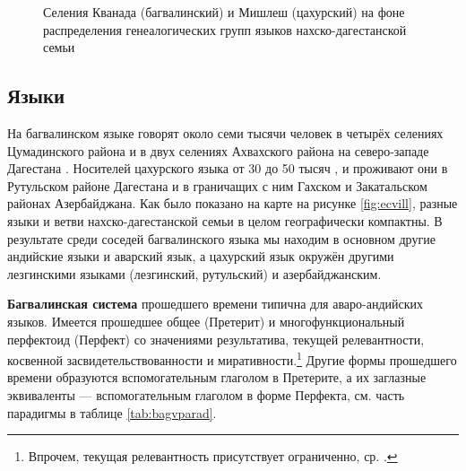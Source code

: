 \begin{figure}[h]
\centering
\caption{Селения Кванада (багвалинский) и Мишлеш (цахурский) на фоне распределения генеалогических групп языков нахско-дагестанской семьи}
\label{fig:kvanmish}
\vspace{0.5cm}
\end{figure}

\subsection{Языки} \label{sec:samplelanguages}

На багвалинском языке говорят около семи тысячи человек в четырёх селениях Цумадинского района и в двух селениях Ахвахского района на северо-западе Дагестана \citep[21]{bagvalalgram}. Носителей цахурского языка от 30 до 50 тысяч \citep[3]{tsakhurgram}, и проживают они в Рутульском районе Дагестана и в граничащих с ним Гахском и Закатальском районах Азербайджана. Как было показано на карте на рисунке \ref{fig:ecvill}, разные языки и ветви нахско-дагестанской семьи в целом географически компактны. В результате среди соседей багвалинского языка мы находим в основном другие андийские языки и аварский язык, а цахурский язык окружён другими лезгинскими языками (лезгинский, рутульский) и азербайджанским.
\par \textbf{Багвалинская система} прошедшего времени типична для аваро-андийских языков. Имеется прошедшее общее (Претерит) и многофункциональный перфектоид (Перфект) со значениями результатива, текущей релевантности, косвенной засвидетельствованности и миративности.\footnote{Впрочем, текущая релевантность присутствует ограниченно, ср. \citep{tatevosov2001}.} Другие формы прошедшего времени образуются вспомогательным глаголом в Претерите, а их заглазные эквиваленты — вспомогательным глаголом в форме Перфекта, см. часть парадигмы в таблице \ref{tab:bagvparad}.

